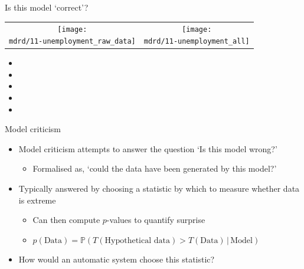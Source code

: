 \begin{frame}{Is this model `correct'?}
\newcommand{\wmgd}{0.5\columnwidth}
\newcommand{\hmgd}{3.0cm}
\newcommand{\mdrd}{../figures/11-unemployment}
\newcommand{\mbm}{\hspace{-0.3cm}}
\begin{tabular}{cc}
\mbm \texttt{[image: \\mdrd/11-unemployment\_raw\_data]} & \texttt{[image: \\mdrd/11-unemployment\_all]}
\end{tabular}

{\footnotesize
\begin{itemize}

  \item  

  \item  

  \item  

  \item  

  \item  

\end{itemize}
}
\end{frame}

\begin{frame}{Model criticism}
  \begin{itemize}
    \item Model criticism attempts to answer the question `Is this model wrong?'
    \begin{itemize}
      \item Formalised as, `could the data have been generated by this model?'
    \end{itemize}
    \vspace{\baselineskip}
    \item Typically answered by choosing a statistic by which to measure whether data is extreme
    \begin{itemize}
      \item Can then compute $p$-values to quantify surprise
      \item $p(\textrm{Data}) = \mathbb{P}(T(\textrm{Hypothetical data}) > T(\textrm{Data}) \,|\, \textrm{Model})$
    \end{itemize}
    \vspace{\baselineskip}
    \item How would an automatic system choose this statistic?
  \end{itemize}
\end{frame}

